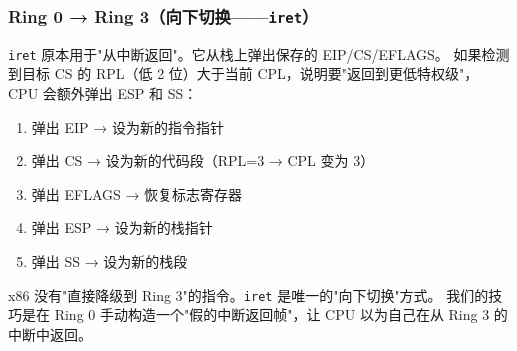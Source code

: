 \subsubsection{Ring 0 → Ring 3（向下切换——\texttt{iret}）}

\texttt{iret} 原本用于"从中断返回"。它从栈上弹出保存的 EIP/CS/EFLAGS。
如果检测到目标 CS 的 RPL（低 2 位）大于当前 CPL，说明要"返回到更低特权级"，
CPU 会额外弹出 ESP 和 SS：

\begin{enumerate}
  \item 弹出 EIP → 设为新的指令指针
  \item 弹出 CS → 设为新的代码段（RPL=3 → CPL 变为 3）
  \item 弹出 EFLAGS → 恢复标志寄存器
  \item 弹出 ESP → 设为新的栈指针
  \item 弹出 SS → 设为新的栈段
\end{enumerate}

\begin{warnbox}
x86 没有"直接降级到 Ring 3"的指令。\texttt{iret} 是唯一的"向下切换"方式。
我们的技巧是在 Ring 0 手动构造一个"假的中断返回帧"，让 CPU 以为自己在从 Ring 3 的中断中返回。
\end{warnbox}
